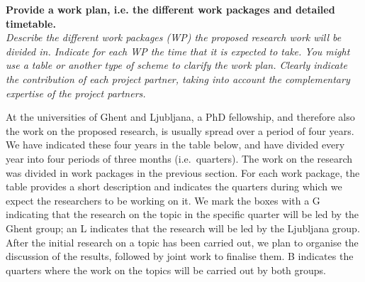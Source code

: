 \documentclass[11pt,dvipsnames,usenames,a4paper]{article}
\begin{document}
%

\vspace{7pt}

\textbf{Provide a work plan, i.e. the different work packages and detailed timetable.}\\
\textit{Describe the different work packages (WP) the proposed research work will be divided in.
Indicate for each WP the time that it is expected to take.
You might use a table or another type of scheme to clarify the work plan. Clearly indicate the contribution of each project partner, taking into account the complementary expertise of the project partners.}


At the universities of Ghent and Ljubljana, a PhD fellowship, and therefore also the work on the proposed research, is usually spread over a period of four years.
We have indicated these four years in the table below, and have divided every year into four periods of three months (i.e.~quarters).
The work on the research was divided in work packages in the previous section.
For each work package, the table provides a short description and indicates the quarters during which we expect the researchers to be working on it.
We mark the boxes with a G indicating that the research on the topic in the specific quarter will be led by the Ghent group; an L indicates that the research will be led by the Ljubljana group. 
After the initial research on a topic has been carried out, we plan to organise the discussion of the results, followed by joint work to finalise them. 
B indicates the quarters where the work on the topics will be carried out by both groups. 
\end{document}
